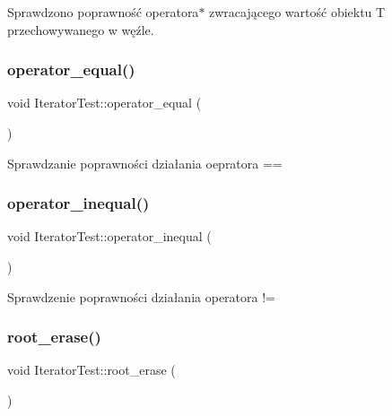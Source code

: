 Sprawdzono poprawność operatora$\ast$ zwracającego wartość obiektu T przechowywanego w węźle. \mbox{\label{class_iterator_test_a4bd66d05af2e1fc6c3d7850ccc7ac783}} 
\subsubsection{\texorpdfstring{operator\+\_\+equal()}{operator\_equal()}}
{\footnotesize\ttfamily void Iterator\+Test\+::operator\+\_\+equal (\begin{DoxyParamCaption}{ }\end{DoxyParamCaption})\hspace{0.3cm}{\ttfamily [inline]}}

Sprawdzanie poprawności działania oepratora == \mbox{\label{class_iterator_test_acd1cdaec5c6d5a2b183bbb8dbd979c2a}} 
\subsubsection{\texorpdfstring{operator\+\_\+inequal()}{operator\_inequal()}}
{\footnotesize\ttfamily void Iterator\+Test\+::operator\+\_\+inequal (\begin{DoxyParamCaption}{ }\end{DoxyParamCaption})\hspace{0.3cm}{\ttfamily [inline]}}

Sprawdzenie poprawności działania operatora != \mbox{\label{class_iterator_test_a4defa697edd8ac31231e2f437f5b01e5}} 
\subsubsection{\texorpdfstring{root\+\_\+erase()}{root\_erase()}}
{\footnotesize\ttfamily void Iterator\+Test\+::root\+\_\+erase (\begin{DoxyParamCaption}{ }\end{DoxyParamCaption})\hspace{0.3cm}{\ttfamily [inline]}}

